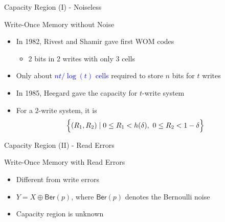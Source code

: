 \documentclass[10pt,presentation]{beamer}
\def\WOM_path{../compound-codes/WOM/slides/Figures}
\begin{document}
\begin{frame}{Capacity Region (I) - Noiseless}
  \begin{center}
    \scalebox{0.5}{}    
  \end{center}
  \begin{block}{Write-Once Memory without Noise}
    \begin{itemize}
    \item In 1982, Rivest and Shamir gave first WOM codes 
      \begin{itemize}
      \item 2 bits in 2 writes with only 3 cells
      \end{itemize}
    \item Only about \textcolor{blue}{$n t / \log(t)$ cells} required to store $n$ bits for $t$ writes
    \item<2-> In 1985, Heegard gave the \alert{capacity} for $t$-write system
    \item<2-> For a $2$-write system, it is
      \begin{align*}
        & \Big{\{} (R_1,R_2) \mid 0 \leq R_1 <  h(\delta) , \,\,0 \leq R_2 < 1-\delta \Big{\}} 
      \end{align*}
    \end{itemize}
  \end{block}
\end{frame}

\begin{frame}{Capacity Region (II) - Read Errors}
  \begin{center}
    \scalebox{0.5}{}
  \end{center}
  \begin{block}{Write-Once Memory with Read Errors}
    \begin{itemize}
    \item Different from write errors
    \item $Y = X \oplus \mathsf{Ber}(p)$, where $\mathsf{Ber}(p)$ denotes the Bernoulli noise
    \item Capacity region is \alert{unknown}
    \end{itemize}
  \end{block}
\end{frame}
\end{document}
